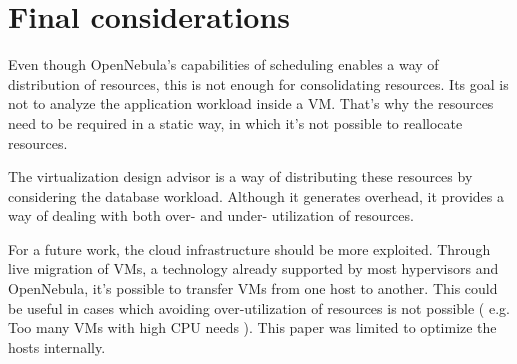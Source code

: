 \chapter{\textbf{Final considerations}}

Even though OpenNebula's capabilities of scheduling enables a way of distribution of resources, this is not enough for consolidating resources. Its goal is not to analyze the application workload inside a VM. That's why the resources need to be required in a static way, in which it's not possible to reallocate resources.

The virtualization design advisor is a way of distributing these resources by considering the database workload. Although it generates overhead, it provides a way of dealing with both over- and under- utilization of resources. 


For a future work, the cloud infrastructure should be more exploited. Through live migration of VMs, a technology already supported by most hypervisors and OpenNebula, it's possible to transfer VMs from one host to another. This could be useful in cases which avoiding over-utilization of resources is not possible ( e.g. Too many VMs with high CPU needs ). This paper was limited to optimize the hosts internally.